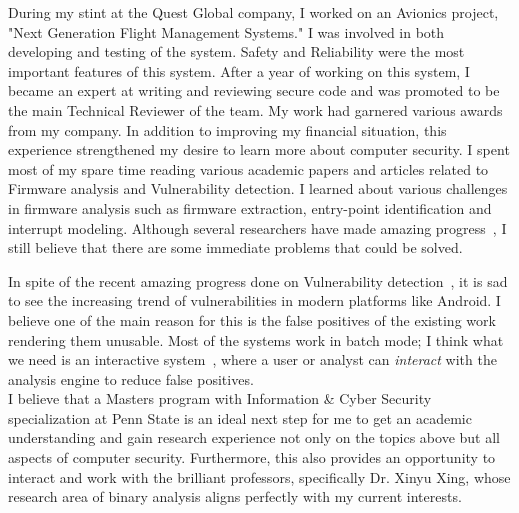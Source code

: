 \documentclass{article}
\begin{document}
During my stint at the Quest Global company, I worked on an Avionics project, "Next Generation Flight Management Systems." I was involved in both developing and testing of the system. Safety and Reliability were the most important features of this system. After a year of working
 on this system, I became an expert at writing and reviewing secure code and was promoted to be the main Technical Reviewer of the team. My work had garnered various awards from my company. In addition to improving my financial situation, this experience strengthened my desire to learn more about computer security. I spent most of my spare time reading various academic papers and articles related to Firmware analysis and Vulnerability detection. I learned about various challenges in firmware analysis such as firmware extraction, entry-point identification and interrupt modeling. Although several researchers have made amazing progress~\cite{zaddach2014avatar, shoshitaishvili2015firmalice, costin2014large}, I still believe that there are some immediate problems that could be solved.

In spite of the recent amazing progress done on Vulnerability detection~\cite{machiry2017dr, redini2017bootstomp}, it is sad to see the increasing trend of vulnerabilities in modern platforms like Android. I believe one of the main reason for this is the false positives of the existing work rendering them unusable. Most of the systems work in batch mode; I think what we need is an interactive system~\cite{Mangal:2015:UAP:2786805.2786851}, where a user or analyst can \emph{interact} with the analysis engine to reduce false positives.\\

I believe that a Masters program with Information \& Cyber Security specialization at Penn State is an ideal next step for me to get an academic understanding and gain research experience not only on the topics above but all aspects of computer security. Furthermore, this also provides an opportunity to interact and work with the brilliant professors, specifically Dr. Xinyu Xing, whose research area of binary analysis aligns perfectly with my current interests.

\medskip

{}

\end{document}

